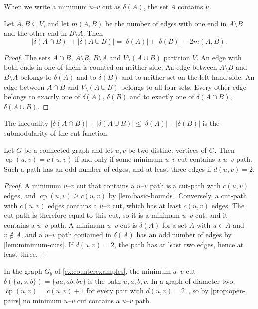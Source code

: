 \documentclass[pdflatex,sn-mathphys-num]{sn-jnl}%
\theoremstyle{thmstyleone}%
\theoremstyle{thmstyletwo}%
\theoremstyle{thmstylethree}%
\newcommand{\cp}{\operatorname{cp}}%
\begin{document}
When we write a minimum $u$--$v$ cut as $\delta(A)$, the set $A$ contains $u$.

\begin{lemma}
\label{lem:uncrossing}
Let $A, B \subseteq V$, and let $m(A, B)$ be the number of edges with one end in $A \setminus B$ and the other end in $B \setminus A$.
Then
\[
|\delta(A \cap B)| + |\delta(A \cup B)| = |\delta(A)| + |\delta(B)| - 2m(A, B).
\]
\end{lemma}

\begin{proof}
The sets $A \cap B$, $A \setminus B$, $B \setminus A$ and $V \setminus (A \cup B)$ partition $V$.
An edge with both ends in one of them is counted on neither side.
An edge between $A \setminus B$ and $B \setminus A$ belongs to $\delta(A)$ and to $\delta(B)$ and to neither set on the left-hand side.
An edge between $A \cap B$ and $V \setminus (A \cup B)$ belongs to all four sets.
Every other edge belongs to exactly one of $\delta(A)$, $\delta(B)$ and to exactly one of $\delta(A \cap B)$, $\delta(A \cup B)$.
\end{proof}

The inequality $|\delta(A \cap B)| + |\delta(A \cup B)| \leq |\delta(A)| + |\delta(B)|$ is the submodularity of the cut function.

\begin{proposition}
\label{prop:open-pairs}
Let $G$ be a connected graph and let $u, v$ be two distinct vertices of $G$.
Then $\cp(u, v) = c(u, v)$ if and only if some minimum $u$--$v$ cut contains a $u$--$v$ path.
Such a path has an odd number of edges, and at least three edges if $d(u, v) = 2$.
\end{proposition}

\begin{proof}
A minimum $u$--$v$ cut that contains a $u$--$v$ path is a cut-path with $c(u, v)$ edges, and $\cp(u, v) \geq c(u, v)$ by \cref{lem:basic-bounds}.
Conversely, a cut-path with $c(u, v)$ edges contains a $u$--$v$ cut, which has at least $c(u, v)$ edges.
The cut-path is therefore equal to this cut, so it is a minimum $u$--$v$ cut, and it contains a $u$--$v$ path.
A minimum $u$--$v$ cut is $\delta(A)$ for a set $A$ with $u \in A$ and $v \notin A$, and a $u$--$v$ path contained in $\delta(A)$ has an odd number of edges by \cref{lem:minimum-cuts}.
If $d(u, v) = 2$, the path has at least two edges, hence at least three.
\end{proof}

In the graph $G_b$ of \cref{ex:counterexamples}, the minimum $u$--$v$ cut $\delta(\{u, s, b\}) = \{ua, ab, bv\}$ is the path $u, a, b, v$.
In a graph of diameter two, $\cp(u, v) = c(u, v) + 1$ for every pair with $d(u, v) = 2$~\cite[Theorem~5.5]{Michel2026MinCutPath}, so by \cref{prop:open-pairs} no minimum $u$--$v$ cut contains a $u$--$v$ path.
\end{document}
